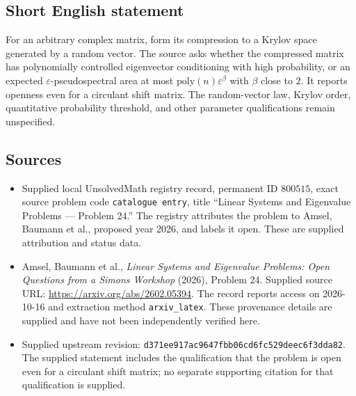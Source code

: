 \documentclass[11pt]{article}
\begin{document}
\subsection{Short English statement}
For an arbitrary complex matrix, form its compression to a Krylov space generated by a random vector. The source asks whether the compressed matrix has polynomially controlled eigenvector conditioning with high probability, or an expected \(\varepsilon\)-pseudospectral area at most \(\mathrm{poly}(n)\varepsilon^\beta\) with \(\beta\) close to \(2\). It reports openness even for a circulant shift matrix. The random-vector law, Krylov order, quantitative probability threshold, and other parameter qualifications remain unspecified.
\subsection{Sources}
\begin{itemize}
\item Supplied local UnsolvedMath registry record, permanent ID \(800515\), exact source problem code \texttt{catalogue entry}, title ``Linear Systems and Eigenvalue Problems --- Problem 24.'' The registry attributes the problem to Amsel, Baumann et al., proposed year 2026, and labels it open. These are supplied attribution and status data.
\item Amsel, Baumann et al., \emph{Linear Systems and Eigenvalue Problems: Open Questions from a Simons Workshop} (2026), Problem 24. Supplied source URL: \url{https://arxiv.org/abs/2602.05394}. The record reports access on 2026-10-16 and extraction method \texttt{arxiv\_latex}. These provenance details are supplied and have not been independently verified here.
\item Supplied upstream revision: \texttt{d371ee917ac9647fbb06cd6fc529deec6f3dda82}. The supplied statement includes the qualification that the problem is open even for a circulant shift matrix; no separate supporting citation for that qualification is supplied.
\end{itemize}
\end{document}
